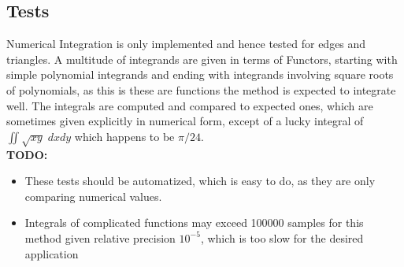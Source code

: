 \subsection{Tests}

\noindent
Numerical Integration is only implemented and hence tested for edges and triangles. A multitude of integrands are given in terms of Functors, starting with simple polynomial integrands and ending with integrands involving square roots of polynomials, as this is these are functions the method is expected to integrate well. The integrals are computed and compared to expected ones, which are sometimes given explicitly in numerical form, except of a lucky integral of $\iint \sqrt{xy} \; dxdy$ which happens to be $\pi / 24$. \\

\textbf{TODO:}
\begin{itemize}
	\item These tests should be automatized, which is easy to do, as they are only comparing numerical values.
	\item Integrals of complicated functions may exceed 100000 samples for this method given relative precision $10^{-5}$, which is too slow for the desired application
\end{itemize}